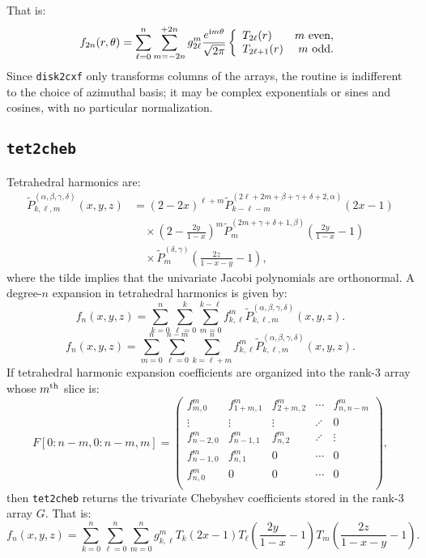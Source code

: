 \documentclass{article}
\def\ii{{\rm i}}
\begin{document}
That is:
\begin{equation}
f_{2n}(r,\theta) = \sum_{\ell=0}^{n}\sum_{m=-2n}^{+2n} g_{2\ell}^m \frac{e^{\ii m\theta}}{\sqrt{2\pi}} \left\{\begin{array}{lr} T_{2\ell}(r) & m~{\rm even},\\ T_{2\ell+1}(r) & m~{\rm odd}.\end{array}\right.
\end{equation}
Since {\tt disk2cxf} only transforms columns of the arrays, the routine is indifferent to the choice of azimuthal basis; it may be complex exponentials or sines and cosines, with no particular normalization.

\subsection{{\tt tet2cheb}}

Tetrahedral harmonics are:
\begin{align}
\tilde{P}_{k,\ell,m}^{(\alpha,\beta,\gamma,\delta)}(x,y,z) & = (2-2x)^{\ell+m} \tilde{P}_{k-\ell-m}^{(2\ell+2m+\beta+\gamma+\delta+2,\alpha)}(2x-1)\nonumber\\
& \quad \times \left(2-\frac{2y}{1-x}\right)^m \tilde{P}_m^{(2m+\gamma+\delta+1,\beta)}\left(\frac{2y}{1-x}-1\right)\\
& \quad \times \tilde{P}_m^{(\delta,\gamma)}\left(\frac{2z}{1-x-y}-1\right),\nonumber
\end{align}
where the tilde implies that the univariate Jacobi polynomials are orthonormal. A degree-$n$ expansion in tetrahedral harmonics is given by:
\begin{equation}
f_n(x,y,z) = \sum_{k=0}^n\sum_{\ell=0}^k\sum_{m=0}^{k-\ell} f_{k,\ell}^m \tilde{P}_{k,\ell,m}^{(\alpha,\beta,\gamma,\delta)}(x,y,z).
\end{equation}
\begin{equation}
f_n(x,y,z) = \sum_{m=0}^n\sum_{\ell=0}^{n-m}\sum_{k=\ell+m}^n f_{k,\ell}^m \tilde{P}_{k,\ell,m}^{(\alpha,\beta,\gamma,\delta)}(x,y,z).
\end{equation}
If tetrahedral harmonic expansion coefficients are organized into the rank-$3$ array whose $m^{\rm th}$ slice is:
\begin{equation}
F[0:n-m,0:n-m,m] = \begin{pmatrix}
f_{m,0}^m & f_{1+m,1}^m & f_{2+m,2}^m & \cdots & f_{n,n-m}^m\\
\vdots & \vdots &  \vdots & \iddots & 0\\
f_{n-2,0}^m & f_{n-1,1}^m & f_{n,2}^m & \iddots & \vdots\\
f_{n-1,0}^m & f_{n,1}^m & 0 & \cdots & 0\\
f_{n,0}^m & 0 & 0 & \cdots & 0\\
\end{pmatrix},
\end{equation}
then {\tt tet2cheb} returns the trivariate Chebyshev coefficients stored in the rank-$3$ array $G$. That is:
\begin{equation}
f_n(x,y,z) = \sum_{k=0}^n\sum_{\ell=0}^n\sum_{m=0}^n g_{k,\ell}^m T_k(2x-1) T_\ell\left(\frac{2y}{1-x}-1\right) T_m\left(\frac{2z}{1-x-y}-1\right).
\end{equation}
\end{document}
